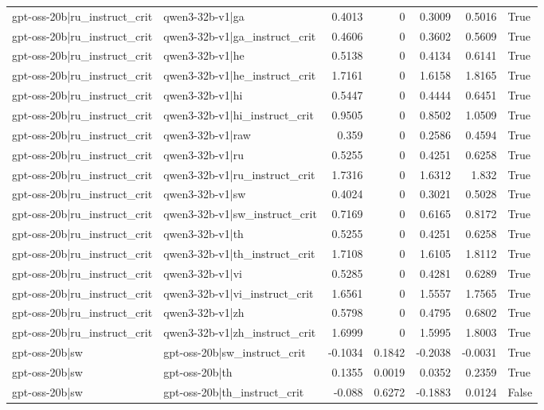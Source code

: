 \begin{table}
\begin{tabular}{l l r r r r l}
gpt-oss-20b|ru_instruct_crit & qwen3-32b-v1|ga & 0.4013 & 0 & 0.3009 & 0.5016 & True \\
gpt-oss-20b|ru_instruct_crit & qwen3-32b-v1|ga_instruct_crit & 0.4606 & 0 & 0.3602 & 0.5609 & True \\
gpt-oss-20b|ru_instruct_crit & qwen3-32b-v1|he & 0.5138 & 0 & 0.4134 & 0.6141 & True \\
gpt-oss-20b|ru_instruct_crit & qwen3-32b-v1|he_instruct_crit & 1.7161 & 0 & 1.6158 & 1.8165 & True \\
gpt-oss-20b|ru_instruct_crit & qwen3-32b-v1|hi & 0.5447 & 0 & 0.4444 & 0.6451 & True \\
gpt-oss-20b|ru_instruct_crit & qwen3-32b-v1|hi_instruct_crit & 0.9505 & 0 & 0.8502 & 1.0509 & True \\
gpt-oss-20b|ru_instruct_crit & qwen3-32b-v1|raw & 0.359 & 0 & 0.2586 & 0.4594 & True \\
gpt-oss-20b|ru_instruct_crit & qwen3-32b-v1|ru & 0.5255 & 0 & 0.4251 & 0.6258 & True \\
gpt-oss-20b|ru_instruct_crit & qwen3-32b-v1|ru_instruct_crit & 1.7316 & 0 & 1.6312 & 1.832 & True \\
gpt-oss-20b|ru_instruct_crit & qwen3-32b-v1|sw & 0.4024 & 0 & 0.3021 & 0.5028 & True \\
gpt-oss-20b|ru_instruct_crit & qwen3-32b-v1|sw_instruct_crit & 0.7169 & 0 & 0.6165 & 0.8172 & True \\
gpt-oss-20b|ru_instruct_crit & qwen3-32b-v1|th & 0.5255 & 0 & 0.4251 & 0.6258 & True \\
gpt-oss-20b|ru_instruct_crit & qwen3-32b-v1|th_instruct_crit & 1.7108 & 0 & 1.6105 & 1.8112 & True \\
gpt-oss-20b|ru_instruct_crit & qwen3-32b-v1|vi & 0.5285 & 0 & 0.4281 & 0.6289 & True \\
gpt-oss-20b|ru_instruct_crit & qwen3-32b-v1|vi_instruct_crit & 1.6561 & 0 & 1.5557 & 1.7565 & True \\
gpt-oss-20b|ru_instruct_crit & qwen3-32b-v1|zh & 0.5798 & 0 & 0.4795 & 0.6802 & True \\
gpt-oss-20b|ru_instruct_crit & qwen3-32b-v1|zh_instruct_crit & 1.6999 & 0 & 1.5995 & 1.8003 & True \\
gpt-oss-20b|sw & gpt-oss-20b|sw_instruct_crit & -0.1034 & 0.1842 & -0.2038 & -0.0031 & True \\
gpt-oss-20b|sw & gpt-oss-20b|th & 0.1355 & 0.0019 & 0.0352 & 0.2359 & True \\
gpt-oss-20b|sw & gpt-oss-20b|th_instruct_crit & -0.088 & 0.6272 & -0.1883 & 0.0124 & False \\

\end{tabular}
\end{table}
